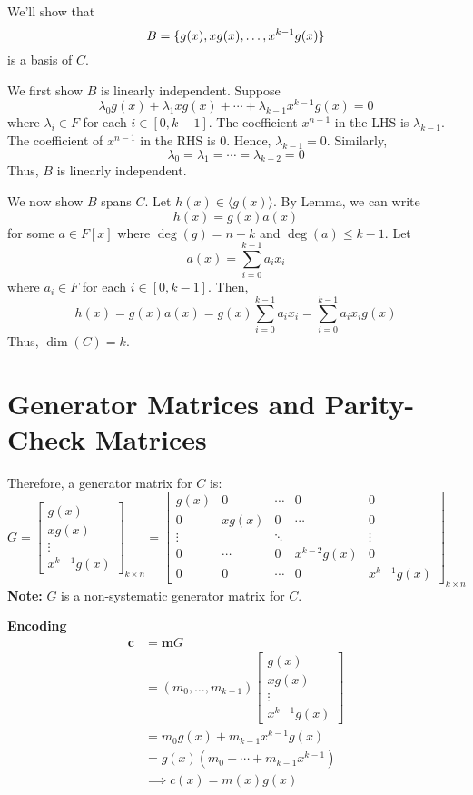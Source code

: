 \begin{Proof}{}{}
We'll show that
\[ B=\{g(x),xg(x),\ldots ,x^{k-1}g(x)\} \]
is a basis of $ C $.

We first show $ B $ is linearly independent. Suppose
\[ \lambda_0g(x)+\lambda_1xg(x)+\cdots+\lambda_{k-1}x^{k-1}g(x)=0 \]
where $ \lambda_i\in F $ for each $ i\in[0,k-1] $.
The coefficient $ x^{n-1} $ in the LHS
is $ \lambda_{k-1} $. The coefficient of $ x^{n-1} $ in the RHS is $ 0 $.
Hence, $ \lambda_{k-1}=0 $. Similarly,
\[ \lambda_0=\lambda_1=\cdots=\lambda_{k-2}=0 \]
Thus, $ B $ is linearly independent.

We now show $ B $ spans $ C $. Let $ h(x)\in \langle g(x)\rangle $.
By Lemma, we can write
\[ h(x)=g(x)a(x) \]
for some $ a\in F[x] $ where $ \deg(g)=n-k $ and $ \deg(a)\leqslant k-1 $. Let
\[ a(x)=\sum\limits_{i=0}^{k-1} a_i x_i \]
where $ a_i\in F $ for each $ i\in[0,k-1] $. Then,
\[ h(x)=g(x)a(x)=g(x)\sum\limits_{i=0}^{k-1} a_i x_i=
    \sum\limits_{i=0}^{k-1} a_i x_i g(x) \]
Thus, $ \dim(C)=k $.
\end{Proof}

\section{Generator Matrices and Parity-Check Matrices}

Therefore, a generator matrix for $ C $ is:
\[ G
    =
    \begin{bmatrix}
        g(x)   \\
        xg(x)  \\
        \vdots \\
        x^{k-1}g(x)
    \end{bmatrix}_{k\times n}
    =
    \begin{bmatrix}
        g(x)   & 0      & \cdots & 0           & 0           \\
        0      & xg(x)  & 0      & \cdots      & 0           \\
        \vdots &        & \ddots &             & \vdots      \\
        0      & \cdots & 0      & x^{k-2}g(x) & 0           \\
        0      & 0      & \cdots & 0           & x^{k-1}g(x)
    \end{bmatrix}_{k\times n}
\]
\textbf{Note:} $ G $ is a non-systematic generator matrix for $ C $.

\textbf{Encoding}
\begin{align*}
    \symbf{c}
     & =\symbf{m}G                        \\
     & =(m_0,\ldots,m_{k-1})
    \begin{bmatrix}
        g(x)   \\
        xg(x)  \\
        \vdots \\
        x^{k-1}g(x)
    \end{bmatrix}             \\
     & =m_0g(x)+m_{k-1}x^{k-1}g(x)        \\
     & =g(x)(m_0+\cdots + m_{k-1}x^{k-1}) \\
     & \implies c(x)=m(x)g(x)
\end{align*}

